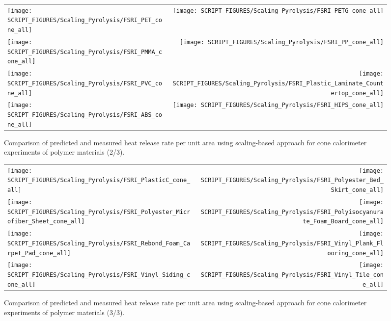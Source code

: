 \begin{figure}[p]
\begin{tabular*}{\textwidth}{l@{\extracolsep{\fill}}r}
\texttt{[image: SCRIPT\_FIGURES/Scaling\_Pyrolysis/FSRI\_PET\_cone\_all]} &
\texttt{[image: SCRIPT\_FIGURES/Scaling\_Pyrolysis/FSRI\_PETG\_cone\_all]} \\
\texttt{[image: SCRIPT\_FIGURES/Scaling\_Pyrolysis/FSRI\_PMMA\_cone\_all]} &
\texttt{[image: SCRIPT\_FIGURES/Scaling\_Pyrolysis/FSRI\_PP\_cone\_all]} \\
\texttt{[image: SCRIPT\_FIGURES/Scaling\_Pyrolysis/FSRI\_PVC\_cone\_all]} &
\texttt{[image: SCRIPT\_FIGURES/Scaling\_Pyrolysis/FSRI\_Plastic\_Laminate\_Countertop\_cone\_all]} \\
\texttt{[image: SCRIPT\_FIGURES/Scaling\_Pyrolysis/FSRI\_ABS\_cone\_all]} &
\texttt{[image: SCRIPT\_FIGURES/Scaling\_Pyrolysis/FSRI\_HIPS\_cone\_all]} \\
\end{tabular*}
\caption[HRRPUA of FSRI materials using scaling model, polymer materials]
{Comparison of predicted and measured heat release rate per unit area using scaling-based approach for cone calorimeter experiments of polymer materials (2/3).}
\label{FSRI_Materials_polymers2}
\end{figure}

\begin{figure}[p]
\begin{tabular*}{\textwidth}{l@{\extracolsep{\fill}}r}
\texttt{[image: SCRIPT\_FIGURES/Scaling\_Pyrolysis/FSRI\_PlasticC\_cone\_all]} &
\texttt{[image: SCRIPT\_FIGURES/Scaling\_Pyrolysis/FSRI\_Polyester\_Bed\_Skirt\_cone\_all]} \\
\texttt{[image: SCRIPT\_FIGURES/Scaling\_Pyrolysis/FSRI\_Polyester\_Microfiber\_Sheet\_cone\_all]} &
\texttt{[image: SCRIPT\_FIGURES/Scaling\_Pyrolysis/FSRI\_Polyisocyanurate\_Foam\_Board\_cone\_all]} \\
\texttt{[image: SCRIPT\_FIGURES/Scaling\_Pyrolysis/FSRI\_Rebond\_Foam\_Carpet\_Pad\_cone\_all]} &
\texttt{[image: SCRIPT\_FIGURES/Scaling\_Pyrolysis/FSRI\_Vinyl\_Plank\_Flooring\_cone\_all]} \\
\texttt{[image: SCRIPT\_FIGURES/Scaling\_Pyrolysis/FSRI\_Vinyl\_Siding\_cone\_all]} &
\texttt{[image: SCRIPT\_FIGURES/Scaling\_Pyrolysis/FSRI\_Vinyl\_Tile\_cone\_all]} \\
\end{tabular*}
\caption[HRRPUA of FSRI materials using scaling model, polymer materials]
{Comparison of predicted and measured heat release rate per unit area using scaling-based approach for cone calorimeter experiments of polymer materials (3/3).}
\label{FSRI_Materials_polymers3}
\end{figure}

